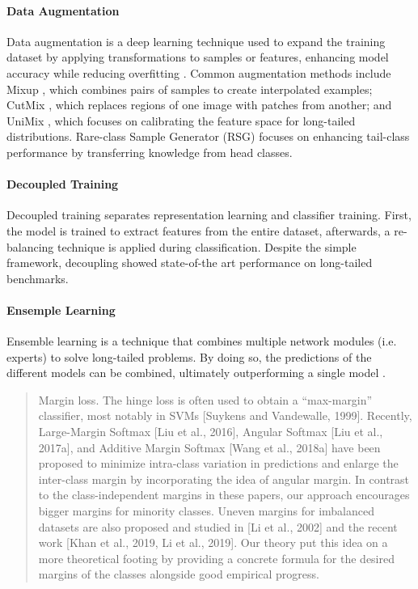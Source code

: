 \paragraph{Data Augmentation}
Data augmentation is a deep learning technique used to expand the training dataset by applying transformations to samples or features, enhancing model accuracy while reducing overfitting \cite{perez2017effectivenessdataaugmentationimage,shorten2019survey}. Common augmentation methods include Mixup \cite{zhang2018mixupempiricalriskminimization}, which combines pairs of samples to create interpolated examples; CutMix \cite{yun2019cutmixregularizationstrategytrain}, which replaces regions of one image with patches from another; and UniMix \cite{xu2021calibratedmodellongtailedvisual}, which focuses on calibrating the feature space for long-tailed distributions. Rare-class Sample Generator (RSG) \cite{wang2021rsgsimpleeffectivemodule} focuses on enhancing tail-class performance by transferring knowledge from head classes.

\paragraph{Decoupled Training}
Decoupled training \cite{kang2020decouplingrepresentationclassifierlongtailed} separates representation learning and classifier training. First, the model is trained to extract features from the entire dataset, afterwards, a re-balancing technique is applied during classification. Despite the simple framework, decoupling showed state-of-the art performance on long-tailed benchmarks.

\paragraph{Ensemple Learning}
Ensemble learning is a technique that combines multiple network modules (i.e. experts) to solve long-tailed problems. By doing so, the predictions of the different models can be combined, ultimately outperforming a single model \cite{zhou2020bbnbilateralbranchnetworkcumulative,wang2022longtailedrecognitionroutingdiverse}.


\begin{quote}
Margin loss. The hinge loss is often used to obtain a “max-margin” classifier, most notably in
SVMs [Suykens and Vandewalle, 1999]. Recently, Large-Margin Softmax [Liu et al., 2016], Angular
Softmax [Liu et al., 2017a], and Additive Margin Softmax [Wang et al., 2018a] have been proposed
to minimize intra-class variation in predictions and enlarge the inter-class margin by incorporating
the idea of angular margin. In contrast to the class-independent margins in these papers, our approach
encourages bigger margins for minority classes. Uneven margins for imbalanced datasets are also
proposed and studied in [Li et al., 2002] and the recent work [Khan et al., 2019, Li et al., 2019]. Our
theory put this idea on a more theoretical footing by providing a concrete formula for the desired
margins of the classes alongside good empirical progress. \cite{cao2019learningimbalanceddatasetslabeldistributionaware}
\end{quote}


